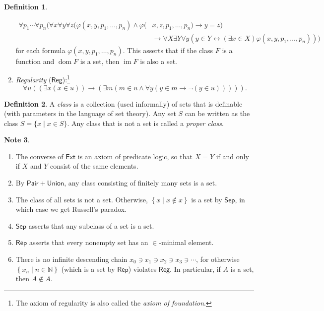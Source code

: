 \documentclass[10pt,letterpaper,cm]{nupset}
\theoremstyle{definition}
\newtheorem{definition}{Definition}[subsection]
\newtheorem{note}[definition]{Note}
\theoremstyle{theorem}
\theoremstyle{remark}
\newcommand{\N}{\mathbb N}
\newcommand{\1}{\mathbf{1}}
\newcommand{\0}{\vec 0}
\DeclareMathOperator{\im}{im}
\DeclareMathOperator{\dom}{dom}
\begin{document}
\begin{definition}
\begin{enumerate}
\[
\begin{aligned} \forall p_1 \cdots \forall p_n( \forall x \forall y \forall z(\varphi(x, y, p_1, \ldots, p_n) \wedge \varphi(&x, z, p_1, \ldots, p_n ) \rightarrow y=z ) \\ & \rightarrow \forall X \exists Y \forall y(y \in Y \leftrightarrow(\exists x \in X) \varphi(x, y, p_1, \ldots, p_n)) ) \end{aligned}
\] for each formula $\varphi(x, y, p_1, \ldots, p_n)$.
This asserts that if the class $F$ is a function and $\dom{F}$ is a set, then $\im{F}$ is also a set. 
\item \textit{Regularity}  ($\mathsf{Reg}$):\footnote{The axiom of regularity is also called the \textit{axiom of foundation}. }
\[
\forall u ((\exists x (x\in u)) \rightarrow (\exists m(m\in u \land \forall y(y\in m \rightarrow \neg(y \in u))))).
\]
\end{enumerate}
\end{definition}
 
\begin{definition}
 A \textit{class} is a collection (used informally) of sets that is definable (with parameters in the language of set theory).  Any set $S$ can be written as the class $S = \{x \mid x \in S\}$. Any class that is not a set is called a \textit{proper class}.
\end{definition} 
 
 \begin{note} $ $
\begin{enumerate}
\item The converse of $\mathsf{Ext}$ is an axiom of predicate logic, so that $X= Y$ if and only if $X$ and $Y$ consist of the same elements.
\item By $\mathsf{Pair} + \mathsf{Union}$, any class consisting of finitely many sets is a set.
\item The class of all sets is not a set. Otherwise, $\left\{x \mid x \notin x\right\}$ is a set by $\mathsf{Sep}$, in which case we get Russell's paradox. 
\item $\mathsf{Sep}$ asserts that any subclass of a set is a set.
\item $\mathsf{Rep}$ asserts that every nonempty set has an $\in$-minimal element.
\item There is no infinite descending chain $x_0 \ni x_1 \ni x_2 \ni x_3 \ni \cdots $, for otherwise $\left\{x_n \mid n \in \N\right\}$ (which is a set by $\mathsf{Rep}$) violates $\mathsf{Reg}$. In particular, if $A$ is a set, then $A\notin A$.
\end{enumerate} 
\end{note}
 
\end{document}
